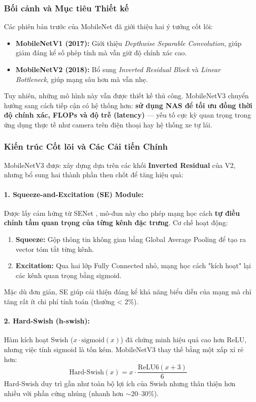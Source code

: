 \subsubsection{Bối cảnh và Mục tiêu Thiết kế}
Các phiên bản trước của MobileNet đã giới thiệu hai ý tưởng cốt lõi:
\begin{itemize}
	\item \textbf{MobileNetV1 (2017):} Giới thiệu \textit{Depthwise Separable Convolution}, giúp giảm đáng kể số phép tính mà vẫn giữ độ chính xác cao.
	\item \textbf{MobileNetV2 (2018):} Bổ sung \textit{Inverted Residual Block} và \textit{Linear Bottleneck}, giúp mạng sâu hơn mà vẫn nhẹ.
\end{itemize}

Tuy nhiên, những mô hình này vẫn được thiết kế thủ công. MobileNetV3 chuyển hướng sang cách tiếp cận có hệ thống hơn: \textbf{sử dụng NAS để tối ưu đồng thời độ chính xác, FLOPs và độ trễ (latency)} — yếu tố cực kỳ quan trọng trong ứng dụng thực tế như camera trên điện thoại hay hệ thống xe tự lái.

\subsubsection{Kiến trúc Cốt lõi và Các Cải tiến Chính}
MobileNetV3 được xây dựng dựa trên các khối \textbf{Inverted Residual} của V2, nhưng bổ sung hai thành phần then chốt để tăng hiệu quả:

\paragraph{1. Squeeze-and-Excitation (SE) Module:}
Được lấy cảm hứng từ SENet \cite{Hu2018}, mô-đun này cho phép mạng học cách \textbf{tự điều chỉnh tầm quan trọng của từng kênh đặc trưng}.  
Cơ chế hoạt động:
\begin{enumerate}
	\item \textbf{Squeeze:} Gộp thông tin không gian bằng Global Average Pooling để tạo ra vector tóm tắt từng kênh.
	\item \textbf{Excitation:} Qua hai lớp Fully Connected nhỏ, mạng học cách "kích hoạt" lại các kênh quan trọng bằng sigmoid.
\end{enumerate}
Mặc dù đơn giản, SE giúp cải thiện đáng kể khả năng biểu diễn của mạng mà chỉ tăng rất ít chi phí tính toán (thường < 2\%).

\paragraph{2. Hard-Swish (h-swish):}
Hàm kích hoạt Swish ($x \cdot \text{sigmoid}(x)$) đã chứng minh hiệu quả cao hơn ReLU, nhưng việc tính sigmoid là tốn kém.  
MobileNetV3 thay thế bằng một xấp xỉ rẻ hơn:
\begin{equation}
	\text{Hard-Swish}(x) = x \cdot \frac{\text{ReLU6}(x+3)}{6}
\end{equation}
Hard-Swish duy trì gần như toàn bộ lợi ích của Swish nhưng thân thiện hơn nhiều với phần cứng nhúng (nhanh hơn $\sim$20–30\%).

